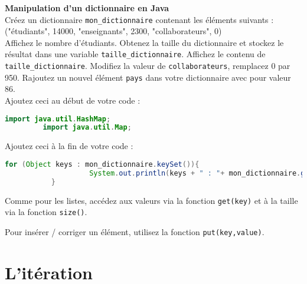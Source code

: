     \begin{Exercice}[15 minutes] \textbf{Manipulation d'un dictionnaire en Java}\\
      	Créez un dictionnaire \lstinline{mon_dictionnaire} contenant les éléments suivants : \\
      	
      	("étudiants", 14000, "enseignants", 2300, "collaborateurs", 0) \\
      	
          Affichez le nombre d'étudiants. Obtenez la taille du dictionnaire et stockez le résultat dans une variable \lstinline{taille_dictionnaire}. Affichez le contenu de \lstinline{taille_dictionnaire}. 
          Modifiez la valeur de \lstinline{collaborateurs}, remplacez 0 par 950. Rajoutez un nouvel élément \lstinline{pays} dans votre dictionnaire avec pour valeur 86.\\
      	
      	Ajoutez ceci au début de votre code :
       
      	\begin{lstlisting}[language=Java]
             import java.util.HashMap;
	     import java.util.Map; \end{lstlisting}
	     
	     Ajoutez ceci à la fin de votre code :
	     
	    \begin{lstlisting}[language=Java]
             for (Object keys : mon_dictionnaire.keySet()){
            		System.out.println(keys + " : "+ mon_dictionnaire.get(keys));
	       } \end{lstlisting} 
    
        \begin{conseil}
           Comme pour les listes, accédez aux valeurs via la fonction \lstinline{get(key)} et à la taille via la fonction \lstinline{size()}.
            
           Pour insérer / corriger un élément, utilisez la fonction \lstinline{put(key,value)}.
		     
        \end{conseil}
        
        \begin{solution}
            
        \end{solution}
    \end{Exercice}
    
    \section{L'itération}
    
